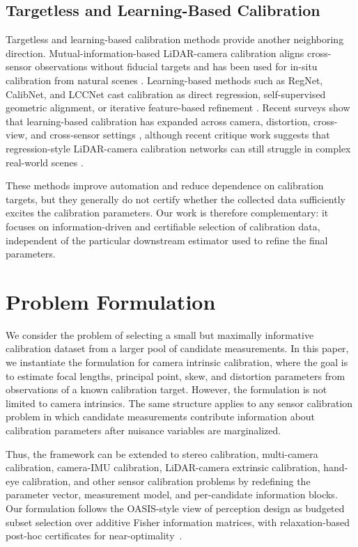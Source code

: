 \documentclass[letterpaper, 9
 pt, conference]{ieeeconf}
\begin{document}
\subsection{Targetless and Learning-Based Calibration}
Targetless and learning-based calibration methods provide another neighboring
direction. Mutual-information-based LiDAR-camera calibration aligns
cross-sensor observations without fiducial targets and has been used for
in-situ calibration from natural scenes \citep{pandey2015mutual}. Learning-based
methods such as RegNet, CalibNet, and LCCNet cast calibration as direct
regression, self-supervised geometric alignment, or iterative feature-based
refinement \citep{schneider2017regnet,iyer2018calibnet,lv2021lccnet}. Recent
surveys show that learning-based calibration has expanded across camera,
distortion, cross-view, and cross-sensor settings \citep{liao2023survey},
although recent critique work suggests that regression-style LiDAR-camera
calibration networks can still struggle in complex real-world scenes
\citep{huang2025whatmatters}.

These methods improve automation and reduce dependence on calibration targets,
but they generally do not certify whether the collected data sufficiently
excites the calibration parameters. Our work is therefore complementary: it
focuses on information-driven and certifiable selection of calibration data,
independent of the particular downstream estimator used to refine the final
parameters.

\section{Problem Formulation}
\label{sec:problem_formulation}

We consider the problem of selecting a small but maximally informative calibration dataset from a larger pool of candidate measurements. In this paper, we instantiate the formulation for camera intrinsic calibration, where the goal is to estimate focal lengths, principal point, skew, and distortion parameters from observations of a known calibration target. However, the formulation is not limited to camera intrinsics. The same structure applies to any sensor calibration problem in which candidate measurements contribute information about calibration parameters after nuisance variables are marginalized.

Thus, the framework can be extended to stereo calibration, multi-camera calibration, camera-IMU calibration, LiDAR-camera extrinsic calibration, hand-eye calibration, and other sensor calibration problems by redefining the parameter vector, measurement model, and per-candidate information blocks. Our formulation follows the OASIS-style view of perception design as budgeted subset selection over additive Fisher information matrices, with relaxation-based post-hoc certificates for near-optimality~\cite{kaveti2023oasis}.
\end{document}
